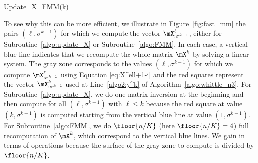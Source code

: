 \begin{subroutine}[ht]
    \caption{Update\_X\_FMM(k)}
    \label{algo:FMM}
\end{subroutine}

To see why this can be more efficient, we illustrate in Figure~\ref{fig:fast_mm} the pairs $(\ell,\sigma^{k-1})$ for which we compute the vector $\mX^{\ell}_{: \sigma^{k-1}}$, either for Subroutine~\ref{algo:update_X} or Subroutine~\ref{algo:FMM}.  In each case, a vertical blue line indicates that we recompute the whole matrix $\mX^k$ by solving a linear system.  The gray zone corresponds to the values $(\ell,\sigma^{k-1})$ for which we compute $\mX^\ell_{: \sigma^{k-1}}$ using Equation \eqref{eq:X^ell+1-i} and the red squares represent the vector $\mX^{k}_{: \sigma^{k-1}}$ used at Line~\ref{algo2:y^k} of Algorithm~\ref{algo:whittle_n3}. For Subroutine~\ref{algo:update_X}, we do one matrix inversion at the beginning and then compute for all $(\ell,\sigma^{k-1})$ with $\ell\le k$ because the red square at value $(k,\sigma^{k-1})$ is computed starting from the vertical blue line at value $(1,\sigma^{k-1})$. For Subroutine~\ref{algo:FMM}, we do $ \floor{n/K}$ (here $ \floor{n/K} =4$) full recomputation of $\mX^k$, which correspond to the vertical blue lines. We gain in terms of operations because the surface of the gray zone to compute is divided by $ \floor{n/K} $.

